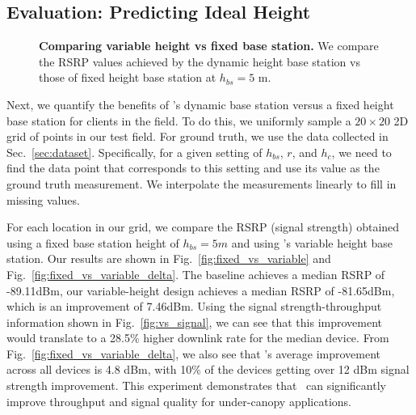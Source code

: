 \subsection{Evaluation: Predicting Ideal Height}
\begin{figure*}[!ht]
     \hfill
     \hfill
    \vspace{-0.15in}
    \caption{\textbf{Comparing variable height vs fixed base station. } We compare the RSRP values achieved by the dynamic height base station vs those of fixed height base station at $h_{bs}=5$ m. }
\label{fig:height_eval}
  \vspace{-0.2in}
\end{figure*}

Next, we quantify the benefits of \name's dynamic base station versus a fixed height base station for clients in the field. To do this, we uniformly sample a $20 \times 20$ 2D grid of points in our test field. For ground truth, we use the data collected in Sec.~\ref{sec:dataset}. Specifically, for a given setting of $h_{bs}$, $r$, and $h_{c}$, we need to find the data point that corresponds to this setting and use its value as the ground truth measurement. We interpolate the measurements linearly to fill in missing values. 


For each location in our grid, we compare the RSRP (signal strength) obtained using a fixed base station height of $h_{bs}=5m$ and using \name's variable height base station. Our results are shown in Fig.~\ref{fig:fixed_vs_variable} and Fig.~\ref{fig:fixed_vs_variable_delta}.
The baseline achieves a median RSRP of -89.11dBm, our variable-height design achieves a median RSRP of -81.65dBm, which is an improvement of 7.46dBm. Using the signal strength-throughput information shown in Fig.~\ref{fig:vs_signal}, we can see that this improvement would translate to a 28.5\% higher downlink rate for the median device. From Fig.~\ref{fig:fixed_vs_variable_delta}, we also see that \name's average improvement across all devices is 4.8 dBm, with 10\% of the devices getting over 12 dBm signal strength improvement. This experiment demonstrates that \name\ can significantly improve throughput and signal quality for under-canopy applications.


